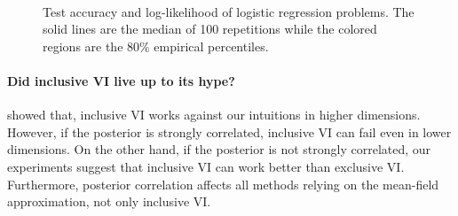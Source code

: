 \begin{figure}
{  } \\
  \caption{Test accuracy and log-likelihood of logistic regression problems.
    The solid lines are the median of 100 repetitions while the colored regions are the 80\% empirical percentiles.
  }
\end{figure}

\paragraph{Did inclusive VI live up to its hype?}
\citet{dhaka_challenges_2021} showed that, inclusive VI works against our intuitions in higher dimensions.
However, if the posterior is strongly correlated, inclusive VI can fail even in lower dimensions.
On the other hand, if the posterior is not strongly correlated, our experiments suggest that inclusive VI can work better than exclusive VI.
Furthermore, posterior correlation affects all methods relying on the mean-field approximation, not only inclusive VI.


